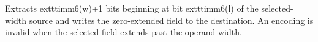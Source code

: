 Extracts 	exttt{imm6(w)+1} bits beginning at bit 	exttt{imm6(l)} of the selected-width source and writes the
zero-extended field to the destination. An encoding is invalid when the selected field extends past the operand
width.
